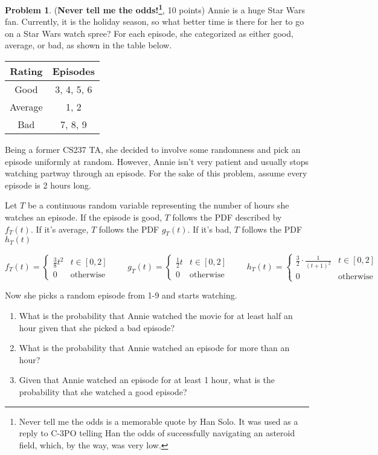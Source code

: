 \documentclass[letterpaper,11pt]{article}
\theoremstyle{plain}%
\theoremstyle{definition}
\newtheorem{problem}{Problem}
\theoremstyle{plain}%
\begin{document}
\begin{problem} (\textbf{Never tell me the odds!\footnote{Never tell me the odds is a memorable quote by Han Solo. It was used as a reply to C-3PO telling Han the odds of successfully navigating an asteroid field, which, by the way, was very low.}}, 10 points)
Annie is a huge Star Wars fan. Currently, it is the holiday season, so what better time is there for her to go on a Star Wars watch spree? For each episode, she categorized as either good, average, or bad, as shown in the table below.

\begin{center}
    \begin{tabular}{|c|c|}
         \hline
         \bf{Rating}   & \bf{Episodes} \\
         \hline
         Good    & 3, 4, 5, 6 \\
         Average & 1, 2 \\
         Bad     & 7, 8, 9  \\
         \hline
    \end{tabular}
\end{center}

Being a former CS237 TA, she decided to involve some randomness and pick an episode uniformly at random. However, Annie isn't very patient and usually stops watching partway through an episode. For the sake of this problem, assume every episode is 2 hours long.

Let $T$ be a continuous random variable representing the number of hours she watches an episode. If the episode is good, $T$ follows the PDF described by $f_T(t)$. If it's average, $T$ follows the PDF $g_T(t)$. If it's bad, $T$ follows the PDF $h_T(t)$

$$f_T(t) =
\begin{cases}
    \frac 3 8 t^2   & t \in [0, 2] \\
    0               & \text{otherwise}
\end{cases}
\quad \quad
g_T(t) =
\begin{cases}
    \frac 1 2 t & t \in [0, 2] \\
    0           & \text{otherwise}
\end{cases}
\quad \quad
h_T(t) =
\begin{cases}
    \frac{3}{2}\cdot\frac{1}{(t+1)^2} & t \in [0, 2] \\
    0           & \text{otherwise}
\end{cases}$$

Now she picks a random episode from 1-9 and starts watching.

\begin{enumerate}[label=(\alph*)]
    \item What is the probability that Annie watched the movie for at least half an hour given that she picked a bad episode?
    \item What is the probability that Annie watched an episode for more than an hour?
    \item Given that Annie watched an episode for at least 1 hour, what is the probability that she watched a good episode?
\end{enumerate}
\end{problem}
\end{document}
